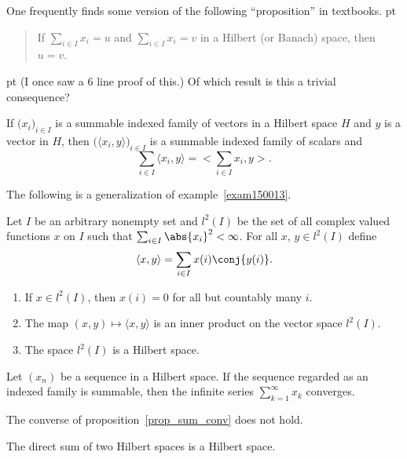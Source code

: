 \begin{rem} One frequently finds some version of the
following ``proposition'' in textbooks.
 pt
\begin{quote}
If $\sum_{i \in I}x_i = u$ and $\sum_{i \in I}x_i = v$ in a
Hilbert (or Banach) space, then $u = v$.
\end{quote}

  pt
\noindent (I once saw a 6 line proof of this.) Of which result is
this a trivial consequence?
\end{rem}

\begin{prop} If $\bigl(x_i\bigr)_{i \in I}$ is a summable indexed family of vectors in a Hilbert space $H$ and
$y$ is a vector in $H$, then $\bigl(\langle x_i,y \rangle\bigr)_{i \in I}$ is a summable indexed family of scalars and
   \[ \sum_{i \in I}\langle x_i,y \rangle  = \biggl < \sum_{i \in I} x_i, y \biggr >. \]
\end{prop}

The following is a generalization of example~\ref{exam150013}.

\begin{exam} Let $I$ be an arbitrary nonempty set and $l^2(I)$ be the set of all complex valued functions $x$ on $I$ such that
$\sum_{i \in I}\abs{x_i}^2 < \infty$. For all $x$, $y \in l^2(I)$ define
    \[ \langle x,y \rangle = \sum_{i \in I}x(i)\conj{y(i)}.\]
  \begin{enumerate}
    \item If $x \in l^2(I)$, then $x(i) = 0$ for all but countably many $i$.
    \item The map $(x,y) \mapsto \langle x,y \rangle$ is an inner product on the vector space $l^2(I)$.
    \item The space $l^2(I)$ is a Hilbert space.
  \end{enumerate}
\end{exam}

\begin{prop}\label{prop_sum_conv} Let $(x_n)$ be a sequence in a Hilbert space.  If the sequence regarded as an indexed family
is summable, then the infinite series $\sum_{k=1}^\infty x_k$ converges.
\end{prop}

\begin{exam} The converse of proposition~\ref{prop_sum_conv} does not hold.
\end{exam}

The direct sum of two Hilbert spaces is a Hilbert space.


